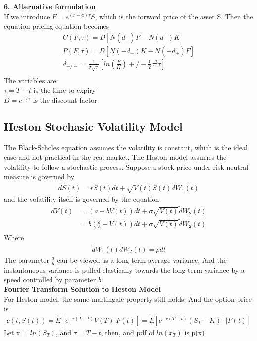 \documentclass[a4paper]{article}
\begin{document}
{\bf 6. Alternative formulation}\\
If we introduce $F = e^{(r-a)\tau} S$, which is the forward price of the asset S. Then the equation pricing equation becomes
\begin{align*}
	C(F,\tau)= D[N(d_+)F - N(d_-)K] \\
	P(F,\tau)= D[N(-d_-)K - N(-d_+)F] \\
	d_{+/-} = \frac{1}{\sigma \sqrt{\tau}}[ln(\frac{F}{K})+/-\frac{1}{2}\sigma^2 \tau] \\
\end{align*}
The variables are:\\
$\tau = T - t$ is the time to expiry\\
$D = e^{-r\tau}$ is the discount factor \\
\subsection{Heston Stochasic Volatility Model}
The Black-Scholes equation assumes the volatility is constant, which is the ideal case and not practical in the real market. The Heston model\cite{heston} assumes the volatility to follow a stochastic process. Suppose a stock price under risk-neutral measure is governed by
\begin{align}
	dS(t) = rS(t)dt + \sqrt{V(t)} S(t) \tilde dW_1(t)
\end{align}
and the volatility itself is governed by the equation
\begin{align}
	dV(t) & = (a -bV(t))dt + \sigma \sqrt{V(t)} \tilde dW_2(t) \\
	      & = b(\frac{a}{b} -V(t))dt + \sigma \sqrt{V(t)} \tilde dW_2(t) \\
\end{align}
Where 
\begin{align*}
	\tilde dW_1(t) \tilde dW_2(t) = \rho dt
\end{align*}
The parameter $\frac{a}{b}$ can be viewed as a long-term average variance. And the instantaneous variance is pulled elastically towards the long-term variance by a speed controlled by parameter $b$.\\ 
{\bf Fourier Transform Solution to Heston Model}\\
For Heston model, the same martingale property still holds. And the option price is
\begin{align*}
	c(t, S(t)) = \tilde E[e^{-r(T-t)}V(T)| F(t)] = \tilde E[e^{-r(T-t)}(S_T - K)^{+}| F(t)]
\end{align*}
Let x = $ln(S_T)$, and $\tau = T - t$, then, and pdf of $ln(x_T)$ is p(x)
\end{document}
